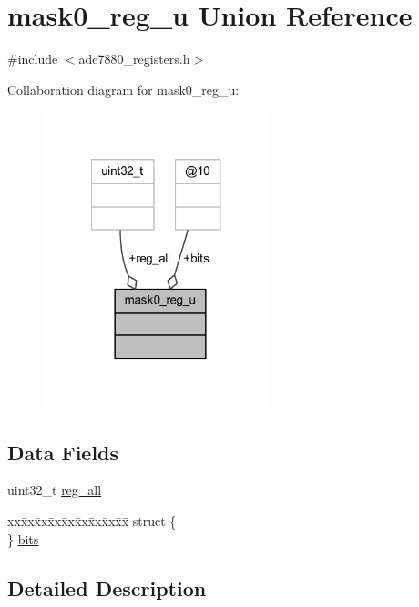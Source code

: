 \hypertarget{a00027}{\section{mask0\-\_\-reg\-\_\-u Union Reference}
\label{d0/d33/a00027}
}


{\ttfamily \#include $<$ade7880\-\_\-registers.\-h$>$}



Collaboration diagram for mask0\-\_\-reg\-\_\-u\-:\nopagebreak
\begin{figure}[H]
\begin{center}
\leavevmode
\includegraphics[width=185pt]{da/d82/a00091}
\end{center}
\end{figure}
\subsection*{Data Fields}
\begin{DoxyCompactItemize}
\item 
uint32\-\_\-t \hyperlink{a00027_ae44a0232a79ff51b5ef7aa80e4b35470}{reg\-\_\-all}
\item 
\begin{tabbing}
xx\=xx\=xx\=xx\=xx\=xx\=xx\=xx\=xx\=\kill
struct \{\\
\} \hyperlink{a00027_af8d64437b498ddbfcbc4d131ebad25c3}{bits}\\

\end{tabbing}\end{DoxyCompactItemize}


\subsection{Detailed Description}


